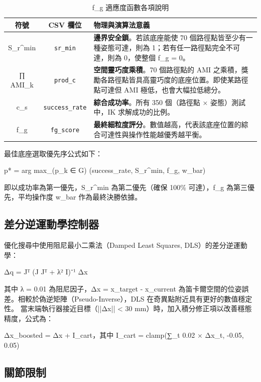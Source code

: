 \documentclass[a4paper, 12pt]{article}
\begin{document}
\begin{table}[H]
\centering
\caption{f\_g 適應度函數各項說明}
\label{tab:fg_terms}
\begin{tabularx}{\textwidth}{c c X}
\toprule
\textbf{符號} & \textbf{CSV 欄位} & \textbf{物理與演算法意義} \\
\midrule
S\_r\^{}min & \texttt{sr\_min} & \textbf{邊界安全鎖}。若該底座能使 70 個路徑點皆至少有一種姿態可達，則為 1；若有任一路徑點完全不可達，則為 0，使整個 f\_g = 0。 \\
\addlinespace
∏ AMI\_k & \texttt{prod\_c} & \textbf{空間靈巧度乘積}。70 個路徑點的 AMI 之乘積，獎勵各路徑點皆具高靈巧度的底座位置。即使某路徑點可達但 AMI 極低，也會大幅拉低總分。 \\
\addlinespace
c\_s & \texttt{success\_rate} & \textbf{綜合成功率}。所有 350 個（路徑點 × 姿態）測試中，IK 求解成功的比例。 \\
\addlinespace
f\_g & \texttt{fg\_score} & \textbf{最終細粒度評分}。數值越高，代表該底座位置的綜合可達性與操作性能越優秀越平衡。 \\
\bottomrule
\end{tabularx}
\end{table}

最佳底座選取優先序公式如下：
\begin{center}
p* = arg max\_(p\_k ∈ G) (success\_rate, S\_r\^{}min, f\_g, w\_bar)
\end{center}
即以成功率為第一優先，S\_r\^{}min 為第二優先（確保 100\% 可達），f\_g 為第三優先，平均操作度 w\_bar 作為最終決勝依據。

\subsection{差分逆運動學控制器}
\label{subsec:dls}

優化搜尋中使用阻尼最小二乘法（Damped Least Squares, DLS）的差分逆運動學：
\begin{center}
Δq = Jᵀ (J Jᵀ + λ² I)⁻¹ Δx
\end{center}
其中 λ = 0.01 為阻尼因子，Δx = x\_target - x\_current 為笛卡爾空間的位姿誤差。相較於偽逆矩陣（Pseudo-Inverse），DLS 在奇異點附近具有更好的數值穩定性。
當末端執行器接近目標（||Δx|| < 30 mm）時，加入積分修正項以改善穩態精度，公式為：
\begin{center}
Δx\_boosted = Δx + I\_cart，其中 I\_cart = clamp(∑\_t 0.02 × Δx\_t, -0.05, 0.05)
\end{center}

\subsection{關節限制}
\label{subsec:joint_limits}
\end{document}
